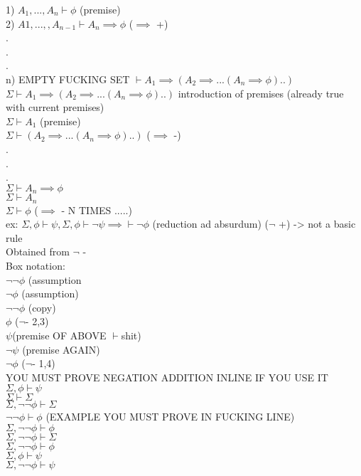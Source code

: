 \documentclass[12pt,oneside,notitlepage]{book}
\theoremstyle{definition}
\begin{document}
1) $A_1,...,A_n \vdash \phi$ (premise) \\
2) $A1,...,,A_{n-1} \vdash A_n \implies \phi$ ($\implies$ +) \\
. \\
. \\
. \\
n) EMPTY FUCKING SET $\vdash A_1 \implies (A_2 \implies ...(A_n \implies \phi ) ..)$ \\
$\Sigma \vdash A_1 \implies (A_2 \implies ...(A_n \implies \phi) ..)$ introduction of premises (already true with current premises) \\
$\Sigma \vdash A_1$ (premise) \\
$\Sigma \vdash (A_2 \implies ...(A_n \implies \phi) ..)$ ($\implies$ -) \\
. \\
. \\
. \\
$\Sigma \vdash A_n \implies \phi$ \\
$\Sigma \vdash A_n$ \\
$\Sigma \vdash \phi$ ($\implies$ - N TIMES .....) \\

ex: $\Sigma, \phi \vdash \psi, \Sigma, \phi \vdash \neg \psi \implies \vdash \neg \phi$ (reduction ad absurdum) ($\neg$ +) -> not a basic rule \\
Obtained from $\neg$ - \\
Box notation: \\
 $\neg \neg \phi$ (assumption \\
    $\neg \phi$ (assumption) \\
    $\neg \neg \phi$ (copy) \\
$ \phi$ ($\neg $- 2,3) \\
 $\psi $(premise OF ABOVE $\vdash $shit) \\
 $\neg \psi$ (premise AGAIN) \\
$\neg \phi$ ($\neg $- 1,4) \\

YOU MUST PROVE NEGATION ADDITION INLINE IF YOU USE IT \\

$\Sigma, \phi \vdash \psi$ \\
$\Sigma \vdash \Sigma$ \\
$\Sigma, \neg \neg \phi \vdash \Sigma$ \\
$\neg \neg \phi \vdash \phi$ (EXAMPLE YOU MUST PROVE IN FUCKING LINE) \\
$\Sigma, \neg \neg \phi \vdash \phi$ \\
$\Sigma, \neg \neg \phi \vdash \Sigma  $ \\
$\Sigma, \neg \neg \phi \vdash \phi$ \\
$\Sigma, \phi \vdash \psi$ \\
$\Sigma, \neg \neg \phi \vdash \psi$ \\
\end{document}
